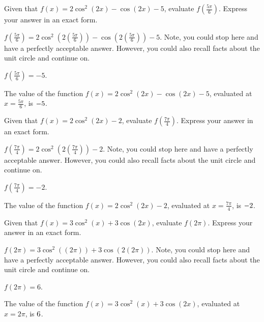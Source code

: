 \begin{shuffle}
\begin{exercise}
Given that $f(x)=2 \cos ^2(2 x)-\cos (2 x)-5$, evaluate $f\left(\frac{5 \pi }{6}\right)$. Express your answer in an exact form.
\begin{solution}
\begin{hint}
$f\left(\frac{5 \pi }{6}\right)=2 \cos ^2(2 \left(\frac{5 \pi }{6}\right))-\cos (2 \left(\frac{5 \pi }{6}\right))-5$. Note, you could stop here and have a perfectly acceptable answer. However, you could also recall facts about the unit circle and continue on. 
\end{hint}
\begin{hint}
$f\left(\frac{5 \pi }{6}\right)=-5$.
\end{hint}
The value of the function $f(x) = 2 \cos ^2(2 x)-\cos (2 x)-5$, evaluated at $x=\frac{5 \pi }{6}$, is ${-5}$.
\end{solution}
\end{exercise}

\begin{exercise}
Given that $f(x)=2 \cos ^2(2 x)-2$, evaluate $f\left(\frac{7 \pi }{4}\right)$. Express your answer in an exact form.
\begin{solution}
\begin{hint}
$f\left(\frac{7 \pi }{4}\right)=2 \cos ^2(2 \left(\frac{7 \pi }{4}\right))-2$. Note, you could stop here and have a perfectly acceptable answer. However, you could also recall facts about the unit circle and continue on. 
\end{hint}
\begin{hint}
$f\left(\frac{7 \pi }{4}\right)=-2$.
\end{hint}
The value of the function $f(x) = 2 \cos ^2(2 x)-2$, evaluated at $x=\frac{7 \pi }{4}$, is ${-2}$.
\end{solution}
\end{exercise}

\begin{exercise}
Given that $f(x)=3 \cos ^2(x)+3 \cos (2 x)$, evaluate $f\left(2 \pi\right)$. Express your answer in an exact form.
\begin{solution}
\begin{hint}
$f\left(2 \pi\right)=3 \cos ^2(\left(2 \pi\right))+3 \cos (2 \left(2 \pi\right))$. Note, you could stop here and have a perfectly acceptable answer. However, you could also recall facts about the unit circle and continue on. 
\end{hint}
\begin{hint}
$f\left(2 \pi\right)=6$.
\end{hint}
The value of the function $f(x) = 3 \cos ^2(x)+3 \cos (2 x)$, evaluated at $x=2 \pi$, is ${6}$.
\end{solution}
\end{exercise}


\end{shuffle}

